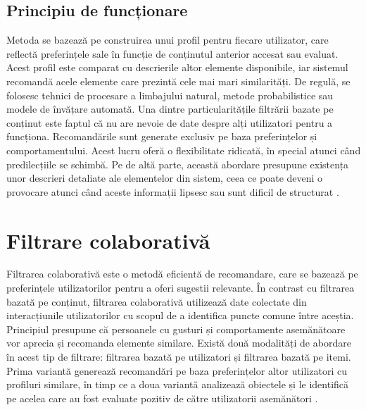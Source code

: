 \subsection{Principiu de funcționare}
\label{subsec:ch3sec1sub1}
Metoda se bazează pe construirea unui profil pentru fiecare utilizator, care reflectă preferințele sale în funcție de conținutul anterior accesat sau evaluat. 
Acest profil este comparat cu descrierile altor elemente disponibile, iar sistemul recomandă acele elemente care prezintă cele mai mari similarități.
De regulă, se folosesc tehnici de procesare a limbajului natural, metode probabilistice sau modele de învățare automată.
Una dintre particularitățile filtrării bazate pe conținut este faptul că nu are nevoie de date despre alți utilizatori pentru a funcționa. Recomandările sunt generate exclusiv pe baza preferințelor și comportamentului.
Acest lucru oferă o flexibilitate ridicată, în special atunci când predilecțiile se schimbă. Pe de altă parte, această abordare presupune existența unor descrieri detaliate ale elementelor din sistem, ceea ce poate deveni o provocare atunci când aceste informații lipsesc sau sunt dificil de structurat \cite{ISINKAYE2015261}.
\section{Filtrare colaborativă}
\label{sec:ch3sec2}
Filtrarea colaborativă este o metodă eficientă de recomandare, care se bazează pe preferințele utilizatorilor pentru a oferi sugestii relevante.
În contrast cu filtrarea bazată pe conținut, filtrarea colaborativă utilizează date colectate din interacțiunile utilizatorilor cu scopul de a identifica puncte comune între aceștia.
Principiul presupune că persoanele cu gusturi și comportamente asemănătoare vor aprecia și recomanda elemente similare.
Există două modalități de abordare în acest tip de filtrare: filtrarea bazată pe utilizatori și filtrarea bazată pe itemi.
Prima variantă generează recomandări pe baza preferințelor altor utilizatori cu profiluri similare, în timp ce a doua variantă analizează obiectele și le identifică pe acelea care au fost evaluate pozitiv de către utilizatorii asemănători \cite{schafer2007collaborative}.

